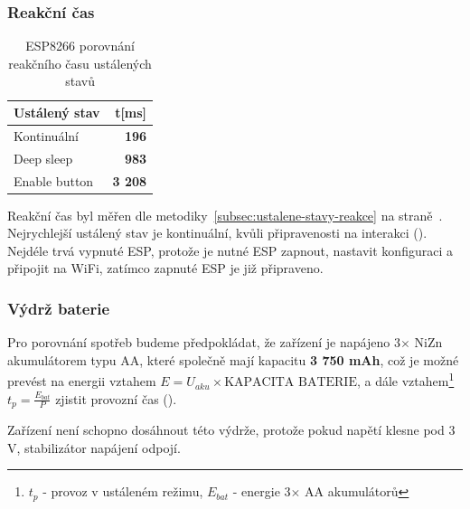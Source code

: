 \documentclass[a4paper, 12pt]{report}
\begin{document}
    \subsubsection{Reakční čas}
    \begin{table}[h!]
        \centering
        \caption{ESP8266 porovnání reakčního času ustálených stavů}
        \begin{tabular}{||l|r||}
            \hline
            Ustálený stav & t[ms]          \\
            \hline
            Kontinuální   & \textbf{196}   \\
            Deep sleep    & \textbf{983}   \\
            Enable button & \textbf{3 208} \\
            \hline
        \end{tabular}
        \label{tab:esp8266-klidove-rezimy-cas}
    \end{table}
    Reakční čas byl měřen dle metodiky~\ref{subsec:ustalene-stavy-reakce} na straně~\pageref{subsec:ustalene-stavy-reakce}.
    Nejrychlejší ustálený stav je kontinuální, kvůli připravenosti na interakci ().
    Nejdéle trvá vypnuté ESP,
    protože je nutné ESP zapnout, nastavit konfiguraci a připojit na WiFi, zatímco zapnuté ESP je již připraveno.

    \subsubsection{Výdrž baterie}
    Pro porovnání spotřeb budeme předpokládat, že zařízení je napájeno 3$\times$ NiZn akumulátorem typu AA, které společně mají kapacitu \textbf{3 750 mAh}, což je možné prevést na energii vztahem $E = U_{aku}\times \textrm{KAPACITA BATERIE}$,
    a dále vztahem\footnote{$ t_{p}$ - provoz v ustáleném režimu, $ E_{bat}$ - energie 3$\times$ AA akumulátorů} $ t_{p} = \frac{E_{bat}}{P}$ zjistit provozní čas ().\par
    Zařízení není schopno dosáhnout této výdrže, protože pokud napětí klesne pod 3 V, stabilizátor napájení odpojí.
\end{document}

